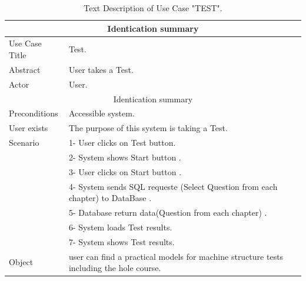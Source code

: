 \begin{table}[h!]
	\begin{center}
		\begin{tabular}{ |p{3cm}|p{9cm}|  }
			\hline
			\multicolumn{2}{|c|}{Identication summary} \\
			\hline
			Use Case Title & Test. \\
			\hline
			Abstract   & User takes a Test. \\
		   \hline
			Actor&  User. \\
		   \hline
		   \multicolumn{2}{|c|}{Identication summary} \\
		   \hline
		   Preconditions & Accessible system.  \\
		   \hline
		   User exists    &  The purpose of this system is taking a Test. \\
		   \hline
		   Scenario &  1- User clicks on Test button. \\ & 2- System shows Start button . \\ & 3- User clicks on Start button . \\ & 4- System sends SQL requeste (Select Question from each chapter) to DataBase . \\ & 5- Database return data(Question from each chapter) .\\ & 6- System loads Test results.\\ & 7- System shows Test results.\\
		   \hline
		   Object&  user can find a practical models for machine structure tests including the hole course. \\
			\hline
\end{tabular}
\end{center}
\caption{Text Description of Use Case "TEST".}
\label{tab:DS TEST}
\end{table}




